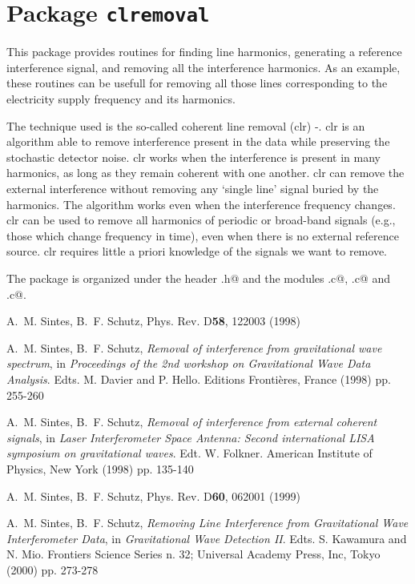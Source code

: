 \chapter{Package \texttt{clremoval}}


This package provides routines for finding line harmonics,
generating a reference interference signal, and removing
all the interference harmonics. As an example, these routines can be usefull
for removing all those lines corresponding to the electricity supply
 frequency and its harmonics.

The technique used  is the so-called coherent line removal 
({\sc clr}) \cite{Sintes:1998}-\cite{Sintes:2000}.
 {\sc clr} is an algorithm able to remove interference present in the
 data while preserving the stochastic detector noise.  {\sc clr}
 works when the interference is present in many harmonics, as long as
   they remain coherent with one another.
{\sc clr} can remove the external
 interference without removing any \lq single line' signal buried by the
 harmonics. The algorithm works even when the interference frequency changes.
{\sc clr} can be used to remove all harmonics of periodic or 
broad-band signals (e.g., those which change frequency in time), even when 
there is no external reference source.  {\sc clr} requires little 
 a priori knowledge of the signals we want to remove.

The package  is organized under the header \verb@CLR.h@ and the modules 
  \verb@HarmonicFinder.c@,  \verb@RefInterference.c@ and
 \verb@CleanAll.c@.



\newpage


\newpage\begin{thebibliography}{0}

  A.~M. Sintes, B.~F. Schutz, Phys. Rev. D\textbf{58}, 122003 (1998)

  A.~M. Sintes, B.~F. Schutz,  
 \textit{Removal of interference from gravitational wave spectrum}, in
 \textit{Proceedings of the 2nd workshop on Gravitational Wave
  Data Analysis}.
  Edts. M. Davier and P. Hello. Editions Fronti\`eres, 
  France (1998) pp. 255-260

  A.~M. Sintes, B.~F. Schutz,  
  \textit{Removal of interference from external coherent signals}, in
  \textit{Laser Interferometer Space Antenna:
  Second international LISA symposium on gravitational waves}.
  Edt. W. Folkner. American Institute of Physics, New York (1998) pp. 135-140

  A.~M. Sintes, B.~F. Schutz, Phys. Rev. D\textbf{60}, 062001 (1999)

  A.~M. Sintes, B.~F. Schutz, 
  \textit{Removing Line Interference from Gravitational Wave 
   Interferometer Data}, in 
  \textit{Gravitational Wave Detection II}.
  Edts. S. Kawamura and N. Mio. Frontiers Science Series n. 32; 
  Universal Academy Press, Inc, Tokyo  (2000) pp. 273-278 
 
\end{thebibliography}

